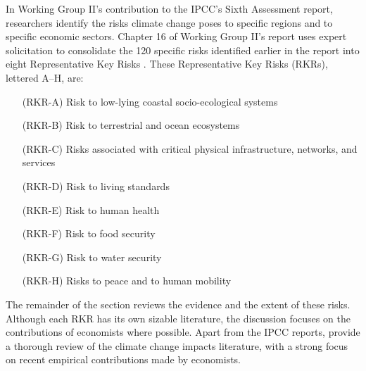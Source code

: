 In Working Group II's contribution to the IPCC's Sixth Assessment report, researchers identify the risks climate change poses to specific regions and to specific economic sectors. Chapter 16 of Working Group II's report uses expert solicitation to consolidate the 120 specific risks identified earlier in the report into eight Representative Key Risks \citep{oneill2022key}. These Representative Key Risks (RKRs), lettered A--H, are:
\begin{itemize}[itemindent = 0.5in]
	\item[(RKR-A)] Risk to low-lying coastal socio-ecological systems
	\item[(RKR-B)] Risk to terrestrial and ocean ecosystems
	\item[(RKR-C)] Risks associated with critical physical infrastructure, networks, and services
	\item[(RKR-D)] Risk to living standards
	\item[(RKR-E)] Risk to human health
	\item[(RKR-F)] Risk to food security
	\item[(RKR-G)] Risk to water security
	\item[(RKR-H)] Risks to peace and to human mobility      
\end{itemize}
The remainder of the section reviews the evidence and the extent of these risks. Although each RKR has its own sizable literature, the discussion focuses on the contributions of economists where possible. Apart from the IPCC reports, \cite{carleton2016social} provide a thorough review of the climate change impacts literature, with a strong focus on recent empirical contributions made by economists.

